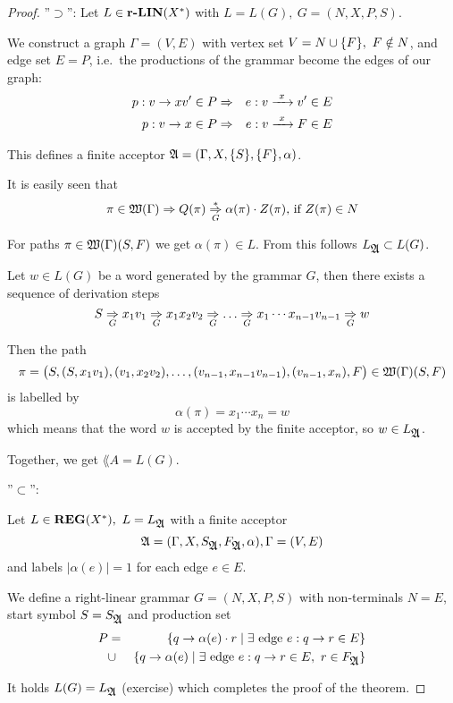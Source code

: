 \begin{proof}

''$\supset$'': Let $L \in \mbox{{\bf r-LIN}}(X^*)$ with $L = L(G),\ G = (N, X, P, S)$.

We construct a graph $\Gamma = (V, E)$ with vertex set $V = N \cup \mbox{$\{F\}$},\ F
\notin N$, and edge set $E = P$, i.e.\ the productions of the grammar become
the edges of our graph:
\begin{eqnarray*}
p: v \to x v' \in P & \Rightarrow & e:  v \xrightarrow{\ {x}\ } v' \in E \\
p: v \to x \in P & \Rightarrow & e : v \xrightarrow{\ {x}\ } F \in E
\end{eqnarray*} 

This defines a finite acceptor $\mbox{$\mathfrak{A}$} = (\Gamma, X, \mbox{$\{S\}$}, \mbox{$\{F\}$},
\alpha)$.

It is easily seen that
\[ \pi \in \mbox{$\mathfrak{W}({\Gamma})$} \Rightarrow Q(\pi) \underset{{G}}{\overset{*}{\Rightarrow}} \alpha(\pi) \cdot
Z(\pi) \text{, if } Z(\pi) \in N \]

For paths $\pi \in \mbox{$\mathfrak{W}({\Gamma})$}(S, F)$ we get $\alpha(\pi) \in L$. From this
follows $L_{\mbox{$\mathfrak{A}$}} \subset L(G)$.

Let $w \in L(G)$ be a word generated by the grammar $G$, then there exists a
sequence of derivation steps 
\[ S \underset{G}{\Rightarrow} x_1 v_1 \underset{G}{\Rightarrow} x_1 x_2 v_2 \underset{G}{\Rightarrow} \ldots
\underset{G}{\Rightarrow} x_1 \cdots x_{n-1} v_{n-1} \underset{G}{\Rightarrow} w \]

Then the path 
\[ \pi = \big(S, (S,x_1 v_1), (v_1, x_2 v_2), \ldots, (v_{n-1}, x_{n-1}
v_{n-1}), (v_{n-1}, x_n), F\big) \in \mbox{$\mathfrak{W}({\Gamma})$}(S, F) \]
is labelled by
\[ \alpha(\pi) = x_1 \cdots x_n = w \]
which means that the word $w$ is accepted by the finite acceptor, so $w \in
L_{\mbox{$\mathfrak{A}$}}$.

Together, we get $\lang{A} = L(G)$.

''$\subset$'':

Let $L \in \mbox{{\bf REG}}(X^*),\ L = L_{\mbox{$\mathfrak{A}$}}$ with a finite acceptor
\[ \mbox{$\mathfrak{A}$} = (\Gamma, X, S_{\mbox{$\mathfrak{A}$}}, F_{\mbox{$\mathfrak{A}$}}, \alpha),\Gamma = (V, E) \] 
and labels $|\alpha(e)| = 1$ for each edge $e \in E$.

We define a right-linear grammar $G = (N, X, P, S)$ with non-terminals $N = E$,
start symbol $S = S_{\mbox{$\mathfrak{A}$}}$ and production set
\begin{eqnarray*}
P & = & \mbox{$\{q \to \alpha(e) \cdot r \mid \exists \text{ edge } e : q \to r
\in E\}$} \\
& \cup & \mbox{$\{q \to \alpha(e) \mid \exists \text{ edge } e : q \to r \in E,\
r \in F_{\mbox{$\mathfrak{A}$}}\}$}
\end{eqnarray*}

It holds $L(G) = L_{\mbox{$\mathfrak{A}$}}$ (exercise) which completes the proof of the
theorem.
\end{proof}

